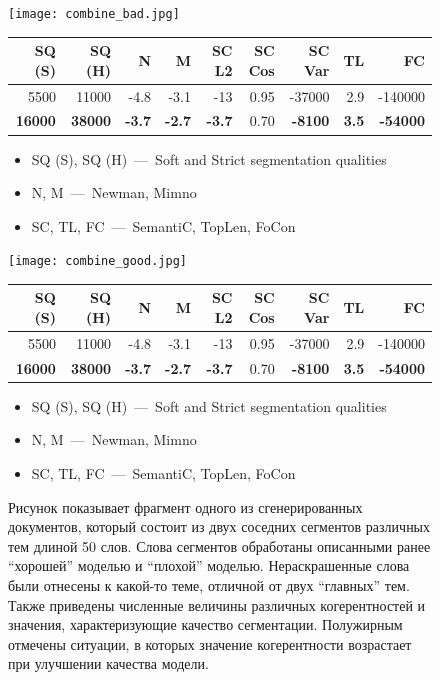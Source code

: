 \begin{figure}[h]

    \centering
    \texttt{[image: combine\_bad.jpg]}

  \vspace{-0.5cm}

    \scriptsize
    \centering
    \begin{tabular}{rrrrrrrrr}
      SQ (S) & SQ (H) & N & M & SC L2 & SC Cos & SC Var & TL & FC\\
      \midrule
      \rowcolor{my-blue-light}
      5500 & 11000 & -4.8 & -3.1 & -13 & 0.95 & -37000 & 2.9 & -140000\\
      \textbf{16000} & \textbf{38000} & \textbf{-3.7} & \textbf{-2.7} & \textbf{-3.7} & 0.70 & \textbf{-8100} & \textbf{3.5} & \textbf{-54000}
    \end{tabular}
  
  \begin{itemize}\setlength{\itemindent}{0pt}
    \small
    \item SQ (S), SQ (H)~---~Soft and Strict segmentation qualities
    \item N, M~---~Newman, Mimno
    \item SC, TL, FC~---~SemantiC, TopLen, FoCon
  \end{itemize}

    \centering
    \texttt{[image: combine\_good.jpg]}

  \vspace{-0.5cm}

    \scriptsize
    \centering
    \begin{tabular}{rrrrrrrrr}
      SQ (S) & SQ (H) & N & M & SC L2 & SC Cos & SC Var & TL & FC\\
      \midrule
      5500 & 11000 & -4.8 & -3.1 & -13 & 0.95 & -37000 & 2.9 & -140000\\
      \rowcolor{my-blue-light}
      \textbf{16000} & \textbf{38000} & \textbf{-3.7} & \textbf{-2.7} & \textbf{-3.7} & 0.70 & \textbf{-8100} & \textbf{3.5} & \textbf{-54000}
    \end{tabular}
  
  \begin{itemize}\setlength{\itemindent}{0pt}
    \small
    \item SQ (S), SQ (H)~---~Soft and Strict segmentation qualities
    \item N, M~---~Newman, Mimno
    \item SC, TL, FC~---~SemantiC, TopLen, FoCon
  \end{itemize}

    \label{fig:segm_good_bad}
    \caption{Рисунок показывает фрагмент одного из сгенерированных документов, который состоит из двух соседних сегментов различных тем длиной 50 слов. Слова сегментов обработаны описанными ранее ``хорошей'' моделью и ``плохой'' моделью. Нераскрашенные слова были отнесены к какой-то теме, отличной от двух ``главных'' тем. Также приведены численные величины различных когерентностей и значения, характеризующие качество сегментации. Полужирным отмечены ситуации, в которых значение когерентности возрастает при улучшении качества модели.}
\end{figure}



